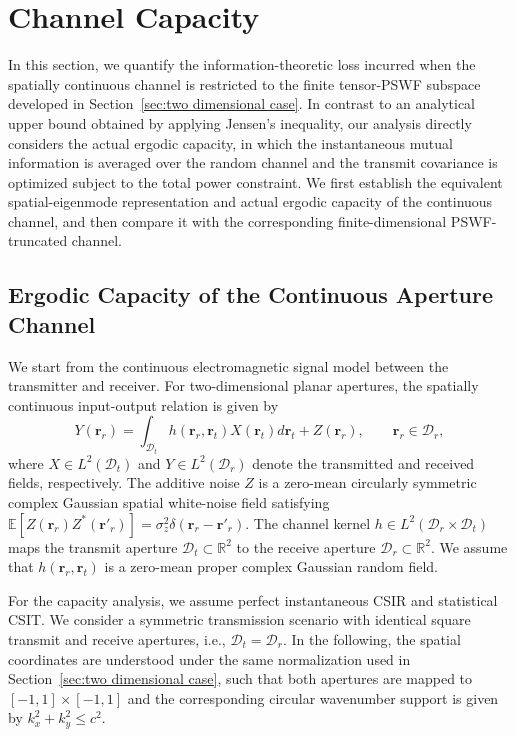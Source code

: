 \documentclass[lettersize,journal]{IEEEtran}
\theoremstyle{plain}
\begin{document}
\section{Channel Capacity}
\label{sec:channel_capacity}
In this section, we quantify the information-theoretic loss incurred
when the spatially continuous channel is restricted to the finite
tensor-PSWF subspace developed in Section~\ref{sec:two dimensional case}. In contrast to an
analytical upper bound obtained by applying Jensen's inequality, our
analysis directly considers the actual ergodic capacity, in which the
instantaneous mutual information is averaged over the random channel
and the transmit covariance is optimized subject to the total power
constraint. We first establish the equivalent spatial-eigenmode
representation and actual ergodic capacity of the continuous channel,
and then compare it with the corresponding finite-dimensional PSWF-truncated
channel.

\subsection{Ergodic Capacity of the Continuous Aperture Channel}
\label{subsec:capacity_limit}

We start from the continuous electromagnetic signal model between
the transmitter and receiver. For two-dimensional planar apertures,
the spatially continuous input-output relation is given by
~\cite{Poon2005Degrees,Poon2006Impact}
\begin{equation}
	Y(\mathbf{r}_r)
	=
	\int_{\mathcal{D}_t}
	h(\mathbf{r}_r,\mathbf{r}_t)
	X(\mathbf{r}_t)
	d\mathbf{r}_t
	+
	Z(\mathbf{r}_r),
	\qquad
	\mathbf{r}_r\in\mathcal{D}_r,
	\label{eq:signal_model}
\end{equation}
where $X\in L^2(\mathcal{D}_t)$ and
$Y\in L^2(\mathcal{D}_r)$ denote the transmitted and received
fields, respectively. The additive noise $Z$ is a zero-mean
circularly symmetric complex Gaussian spatial white-noise field
satisfying $\mathbb{E}[Z(\mathbf{r}_r)Z^*(\mathbf{r}'_r)]
=\sigma_z^2\delta(\mathbf{r}_r-\mathbf{r}'_r)$.
The channel kernel $h\in L^2(\mathcal{D}_r\times\mathcal{D}_t)$ maps
the transmit aperture $\mathcal{D}_t\subset\mathbb{R}^2$ to the
receive aperture $\mathcal{D}_r\subset\mathbb{R}^2$. We assume that \(h(\mathbf r_r,\mathbf r_t)\) is a zero-mean proper complex Gaussian random field.

For the capacity analysis, we assume perfect instantaneous CSIR and statistical CSIT. We consider a symmetric transmission scenario with identical square transmit and receive
apertures, i.e., $\mathcal{D}_t=\mathcal{D}_r$. In the following,
the spatial coordinates are understood under the same normalization
used in Section~\ref{sec:two dimensional case}, such that both apertures are mapped to
$[-1,1]\times[-1,1]$ and the corresponding circular wavenumber
support is given by $k_x^2+k_y^2\leq c^2$.
\end{document}

